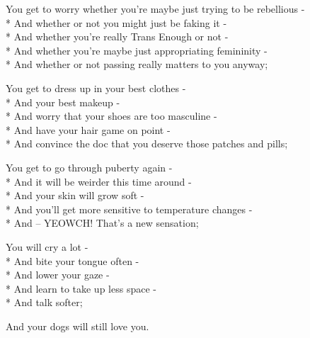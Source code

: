 \documentclass[12pt,letterpaper,oneside]{memoir}
\begin{document}
  \vspace{1pc}
  \noindent
  You get to worry whether you're maybe just trying to be rebellious -\\*
  \hspace*{0.25cm} And whether or not you might just be faking it -\\*
  \hspace*{0.25cm} And whether you're really Trans Enough or not -\\*
  \hspace*{0.25cm} And whether you're maybe just appropriating femininity -\\*
  \hspace*{0.25cm} And whether or not passing really matters to you anyway;

  \vspace{1pc}
  \noindent
  You get to dress up in your best clothes -\\*
  \hspace*{0.25cm} And your best makeup -\\*
  \hspace*{0.25cm} And worry that your shoes are too masculine -\\*
  \hspace*{0.25cm} And have your hair game on point -\\*
  \hspace*{0.25cm} And convince the doc that you deserve those patches and pills;

  \newpage
  \noindent
  You get to go through puberty again -\\*
  \hspace*{0.25cm} And it will be weirder this time around -\\*
  \hspace*{0.25cm} And your skin will grow soft -\\*
  \hspace*{0.25cm} And you'll get more sensitive to temperature changes -\\*
  \hspace*{0.25cm} And -- YEOWCH! That's a new sensation;

  \vspace{1pc}
  \noindent
  You will cry a lot -\\*
  \hspace*{0.25cm} And bite your tongue often -\\*
  \hspace*{0.25cm} And lower your gaze -\\*
  \hspace*{0.25cm} And learn to take up less space -\\*
  \hspace*{0.25cm} And talk softer;

  \vspace{1pc}
  \noindent
  And your dogs will still love you.
\end{document}

